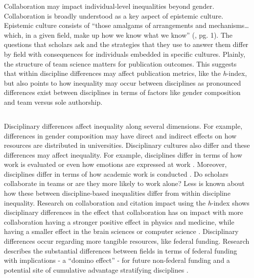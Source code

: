 \documentclass[
  10pt,
  letterpaper,
]{article}
\providecommand{\DIFaddtex}[1]{{\protect\color{blue}\uwave{#1}}} %
\providecommand{\DIFaddbegin}{} %
\providecommand{\DIFaddend}{} %
\providecommand{\DIFdelbegin}{} %
\providecommand{\DIFdelend}{} %
\providecommand{\DIFadd}[1]{\texorpdfstring{\DIFaddtex{#1}}{#1}} %
\newcommand{\DIFscaledelfig}{0.5}
\newlength{\DIFdelgraphicswidth} %
\newlength{\DIFdelgraphicsheight} %
\newcommand{\DIFaddincludegraphics}[2][]{{\color{blue}\fbox{\DIFOincludegraphics[#1]{#2}}}} %
\newcommand{\DIFdelincludegraphics}[2][]{%
\sbox{\DIFdelgraphicsbox}{\DIFOincludegraphics[#1]{#2}}%
\settoboxwidth{\DIFdelgraphicswidth}{\DIFdelgraphicsbox} %
\settoboxtotalheight{\DIFdelgraphicsheight}{\DIFdelgraphicsbox} %
\scalebox{\DIFscaledelfig}{%
\parbox[b]{\DIFdelgraphicswidth}{\usebox{\DIFdelgraphicsbox}\\[-\baselineskip] \rule{\DIFdelgraphicswidth}{0em}}\llap{\resizebox{\DIFdelgraphicswidth}{\DIFdelgraphicsheight}{%
\setlength{\unitlength}{\DIFdelgraphicswidth}%
\begin{picture}(1,1)%
\thicklines\linethickness{2pt} %
{\color[rgb]{1,0,0}\put(0,0){\framebox(1,1){}}}%
{\color[rgb]{1,0,0}\put(0,0){\line( 1,1){1}}}%
{\color[rgb]{1,0,0}\put(0,1){\line(1,-1){1}}}%
\end{picture}%
}\hspace*{3pt}}} %
} %
\DeclareRobustCommand{\DIFaddbegin}{\DIFOaddbegin \let\includegraphics\DIFaddincludegraphics} %
\DeclareRobustCommand{\DIFaddend}{\DIFOaddend \let\includegraphics\DIFOincludegraphics} %
\DeclareRobustCommand{\DIFdelbegin}{\DIFOdelbegin \let\includegraphics\DIFdelincludegraphics} %
\DeclareRobustCommand{\DIFdelend}{\DIFOaddend \let\includegraphics\DIFOincludegraphics} %
\begin{document}
Collaboration may impact individual-level inequalities beyond gender.
Collaboration is broadly understood as a key aspect of epistemic
culture. Epistemic culture consists of ``those amalgams of arrangements
and mechanisms\ldots which, in a given field, make up how we know what
we know'' (\citep{cetina_epistemic_1999}, pg. 1). The questions that
scholars ask and the strategies that they use to answer them differ by
field with consequences for individuals embedded in specific cultures.
Plainly, the structure of team science matters for publication outcomes.
This suggests that within discipline differences may affect publication
metrics, like the \emph{h}-index, but also points to how inequality may
occur between disciplines as pronounced differences exist between
disciplines in terms of factors like gender composition and team versus
sole authorship.

\DIFdelbegin %
\DIFdelend \DIFaddbegin \subsection{\DIFadd{Inequality Between Disciplines and
Fields}}\label{inequality-between-disciplines-and-fields}
\DIFaddend 

Disciplinary differences affect inequality along several dimensions. For
example, differences in gender composition may have direct and indirect
effects on how resources are distributed in universities. Disciplinary
cultures also differ and these differences may affect inequality. For
example, disciplines differ in terms of how work is evaluated
\citep{lamont_how_2009} or even how emotions are expressed at work
\citep{koppman_joy_2015}. Moreover, disciplines differ in terms of how
academic work is conducted \citep{huang_historical_2020}. Do scholars
collaborate in teams or are they more likely to work alone? Less is
known about how these between discipline-based inequalities differ from
within discipline inequality. Research on collaboration and citation
impact using the \emph{h}-index shows disciplinary differences in the
effect that collaboration has on impact with more collaboration having a
stronger positive effect in physics and medicine, while having a smaller
effect in the brain sciences or computer science
\citep{parish_dynamics_2018}. Disciplinary differences occur regarding
more tangible resources, like federal funding. Research describes the
substantial differences between fields in terms of federal funding with
implications - a ``domino effect'' - for future non-federal funding and
a potential site of cumulative advantage stratifying disciplines
\citep{lanahan_domino_2016, lynn_15_2021}.
\end{document}
